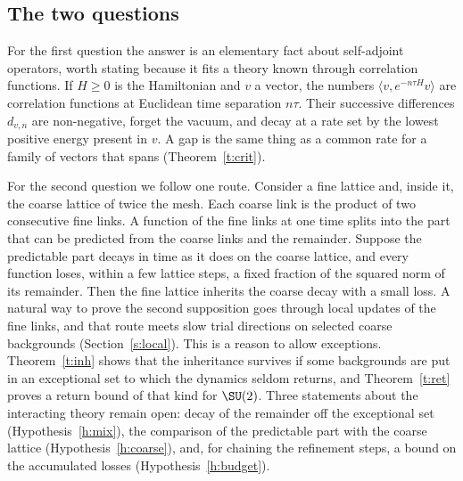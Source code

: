 \subsection{The two questions}
For the first question the answer is an elementary fact about self-adjoint operators, worth stating because
it fits a theory known through correlation functions. If $H\ge0$ is the Hamiltonian and $v$ a vector, the
numbers $\langle v,e^{-n\tau H}v\rangle$ are correlation functions at Euclidean time separation $n\tau$. Their
successive differences $d_{v,n}$ are non-negative, forget the vacuum, and decay at a rate set by the lowest
positive energy present in $v$. A gap is the same thing as a common rate for a family of vectors that spans
(Theorem~\ref{t:crit}).

For the second question we follow one route. Consider a fine lattice and, inside it, the coarse lattice of
twice the mesh. Each coarse link is the product of two consecutive fine links. A function of the fine links at
one time splits into the part that can be predicted from the coarse links and the remainder. Suppose the
predictable part decays in time as it does on the coarse lattice, and every function loses, within a few
lattice steps, a fixed fraction of the squared norm of its remainder. Then the fine lattice inherits the coarse decay with a small loss. A natural way to prove the second supposition goes through local updates of the fine links, and that
route meets slow trial directions on selected coarse backgrounds (Section~\ref{s:local}). This is a reason to allow exceptions. Theorem~\ref{t:inh} shows
that the inheritance survives if some backgrounds are put in an exceptional set to which the dynamics seldom
returns,
and Theorem~\ref{t:ret} proves a return bound of that kind for $\SU(2)$. Three statements about the
interacting theory remain open: decay of the remainder off the exceptional set (Hypothesis~\ref{h:mix}), the
comparison of the predictable part with the coarse lattice (Hypothesis~\ref{h:coarse}), and, for chaining the
refinement steps, a bound on the accumulated losses (Hypothesis~\ref{h:budget}).

